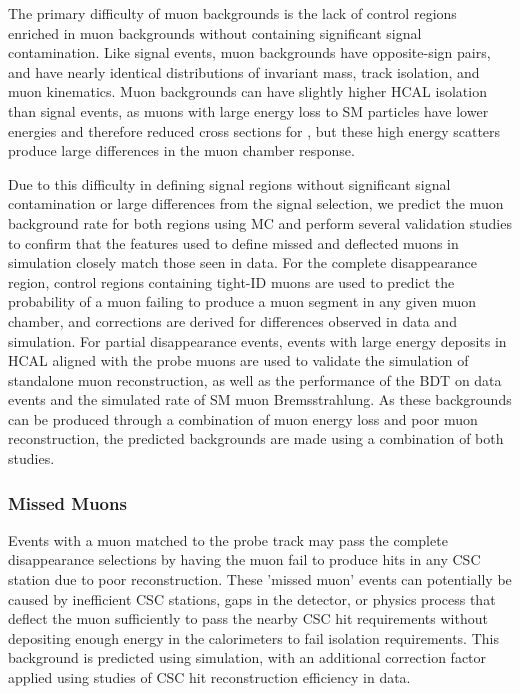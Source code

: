 The primary difficulty of muon backgrounds is the lack of control regions enriched in muon backgrounds without containing significant signal contamination.
Like signal events, muon backgrounds have opposite-sign pairs, and have nearly identical distributions of invariant mass, track isolation, and muon kinematics.
Muon backgrounds can have slightly higher HCAL isolation than signal events, as muons with large energy loss to SM particles have lower energies and therefore reduced cross sections for \dbrem, but these high energy scatters produce large differences in the muon chamber response.

Due to this difficulty in defining signal regions without significant signal contamination or large differences from the signal selection, we predict the muon background rate for both regions using MC and perform several validation studies to confirm that the features used to define missed and deflected muons in simulation closely match those seen in data.
For the complete disappearance region, control regions containing tight-ID muons are used to predict the probability of a muon failing to produce a muon segment in any given muon chamber, and corrections are derived for differences observed in data and simulation.
For partial disappearance events, events with large energy deposits in HCAL aligned with the probe muons are used to validate the simulation of standalone muon reconstruction, as well as the performance of the BDT on data events and the simulated rate of SM muon Bremsstrahlung.
As these backgrounds can be produced through a combination of muon energy loss and poor muon reconstruction, the predicted backgrounds are made using a combination of both studies.

\subsubsection{Missed Muons}
Events with a muon matched to the probe track may pass the complete disappearance selections by having the muon fail to produce hits in any CSC station due to poor reconstruction. 
These 'missed muon' events can potentially be caused by inefficient CSC stations, gaps in the detector, or physics process that deflect the muon sufficiently to pass the nearby CSC hit requirements without depositing enough energy in the calorimeters to fail isolation requirements. 
This background is predicted using simulation, with an additional correction factor applied using studies of CSC hit reconstruction efficiency in data. 

